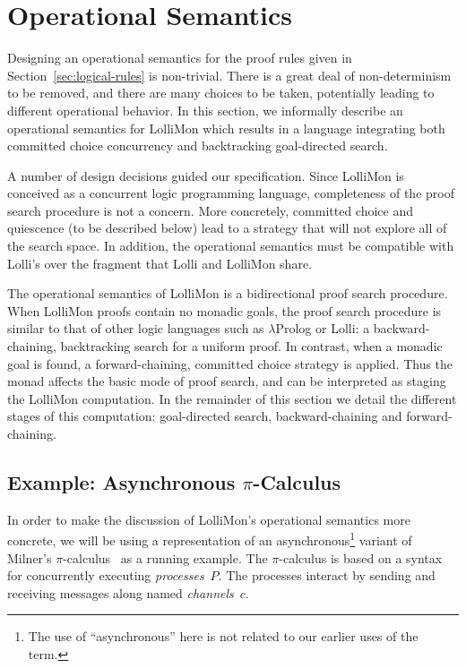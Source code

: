 \documentclass{sig-alt}
\begin{document}
\section{Operational Semantics}
\label{sec:opsem}
Designing an operational semantics for the proof rules given in
Section~\ref{sec:logical-rules} is non-trivial.  There is a great deal of
non-determinism to be removed, and there are many choices to be taken,
potentially leading to different operational behavior.  In this section, we informally
describe an operational semantics for LolliMon which results in a
language integrating both committed choice concurrency and
backtracking goal-directed search.

A number of design decisions guided our specification.  Since LolliMon
is conceived as a concurrent logic programming language, completeness
of the proof search procedure is not a concern.  More concretely,
committed choice and quiescence (to be described below) lead to a
strategy that will not explore all of the search space.  In addition,
the operational semantics must be compatible with Lolli's over the fragment
that Lolli and LolliMon share.

The operational semantics of LolliMon is a bidirectional proof search
procedure.  When LolliMon proofs contain no monadic goals, the proof
search procedure is similar to that of other logic languages such as
$\lambda$Prolog or Lolli: a backward-chaining, backtracking
search for a uniform proof.  In contrast, when a monadic
goal is found, a forward-chaining, committed choice strategy is
applied.  Thus the monad affects the basic mode of proof search, and
can be interpreted as staging the LolliMon computation.  In the
remainder of this section we detail the different stages of this
computation: goal-directed search, backward-chaining and
forward-chaining.

\subsection{Example: Asynchronous $\pi$-Calculus}

In order to make the discussion of LolliMon's operational semantics
more concrete, we will be using a representation of an
asynchronous\footnote{The use of ``asynchronous'' here is not related
to our earlier uses of the term.}  variant of Milner's
$\pi$-calculus~\cite{Milner99} as a running example. The $\pi$-calculus is
based on a syntax for concurrently executing \emph{processes}~$P$. The
processes interact by sending and receiving messages along named
\emph{channels}~$c$.
\end{document}
